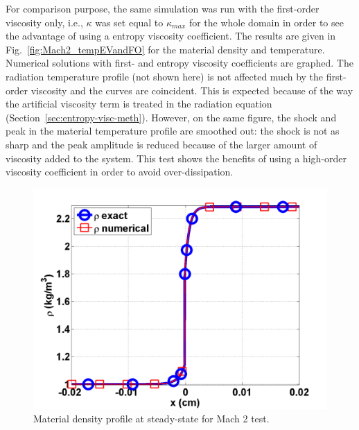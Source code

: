 \documentclass[review]{elsarticle}
\newcommand{\fig}[1]{Fig.~\ref{#1}}                      %
\newcommand{\sect}[1]{Section~\ref{#1}}                     %
\begin{document}
For comparison purpose, the same simulation was run with the first-order viscosity only, i.e., $\kappa$ was set equal to $\kappa_{max}$ for the whole domain in order to see the advantage of using a entropy viscosity coefficient. The results are given in \fig{fig:Mach2_tempEVandFO} for the material density and temperature. Numerical solutions with first- and entropy viscosity coefficients are graphed. The radiation temperature profile (not shown here) is not affected much by the first-order viscosity and the curves are coincident. This is expected because of the way the artificial viscosity term is treated in the radiation equation (\sect{sec:entropy-visc-meth}). However, on the same figure, the shock and peak in the material temperature profile are smoothed out: the shock is not as sharp and the peak amplitude is reduced because of the larger amount of viscosity added to the system. This test shows the benefits of using a high-order viscosity coefficient in order to avoid over-dissipation.
\begin{figure}[H]
                \centering
                \includegraphics[width=\textwidth]{Mach_2_nel_2000_density.png}
        \caption{Material density profile at steady-state for Mach 2 test.}\label{fig:Mach2_density}
\end{figure}
\end{document}
